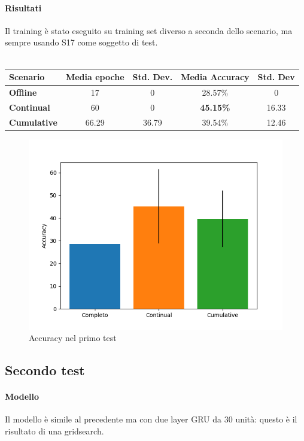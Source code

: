 \documentclass[11pt, a4paper, twoside, openright]{book}
\begin{document}
\paragraph{Risultati} Il training è stato eseguito su training set diverso a seconda dello scenario, ma sempre usando S17 come soggetto di test.\\\\
\begin{tabular}{l|c|c|c|c}
    \textbf{Scenario} & \textbf{Media epoche} & \textbf{Std. Dev.} & \textbf{Media Accuracy} & \textbf{Std. Dev} \\
    \hline 
    \textbf{Offline} & 17 & 0 & 28.57\% & 0 \\
    \textbf{Continual} & 60 & 0 & \textbf{45.15\%} & 16.33 \\
    \textbf{Cumulative} & 66.29 & 36.79 & 39.54\% & 12.46 \\
\end{tabular}
\begin{figure}
    \centering
    \includegraphics[scale=0.75]{img/first.png}
    \caption{Accuracy nel primo test}
    \label{fig:first}
\end{figure}
\subsection{Secondo test}
\paragraph{Modello} Il modello è simile al precedente ma con due layer GRU da 30 unità: questo è il risultato di una gridsearch.
\end{document}
